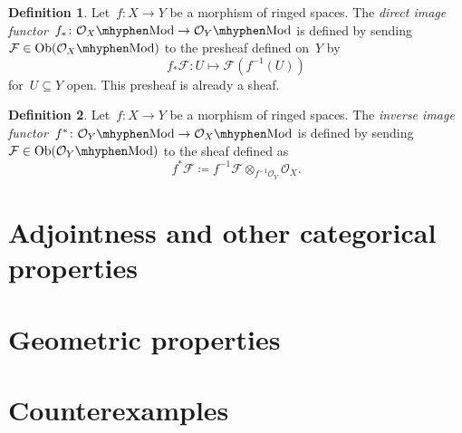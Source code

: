 \documentclass[a4paper,10pt]{article}
\theoremstyle{definition}
\newtheorem{definition}{Definition}
\DeclareMathOperator\Ob{Ob}
\begin{document}
\begin{definition}
  Let~$f\colon X\to Y$ be a morphism of ringed spaces. The \emph{direct image functor}~$f_*\colon\Mod{\mathcal{O}_X}\to\Mod{\mathcal{O}_Y}$ is defined by sending~$\mathcal{F}\in\Ob(\Mod{\mathcal{O}_X})$ to the presheaf defined on~$Y$ by
  \begin{equation}
    f_*\mathcal{F}\colon U\mapsto\mathcal{F}(f^{-1}(U))
    \label{equation:direct-image-O_X-modules}
  \end{equation}
  for~$U\subseteq Y$ open. This presheaf is already a sheaf.
\end{definition}

\begin{definition}
  Let~$f\colon X\to Y$ be a morphism of ringed spaces. The \emph{inverse image functor}~$f^*\colon\Mod{\mathcal{O}_Y}\to\Mod{\mathcal{O}_X}$ is defined by sending~$\mathcal{F}\in\Ob(\Mod{\mathcal{O}_Y})$ to the sheaf defined as
  \begin{equation}
    f^*\mathcal{F}\coloneqq f^{-1}\mathcal{F}\otimes_{f^{-1}\mathcal{O}_Y}\mathcal{O}_X.
    \label{equation:inverse-image-O_X-modules}
  \end{equation}
\end{definition}

\section{Adjointness and other categorical properties}
\label{section:categorical-properties}

\section{Geometric properties}
\label{section:geometric-properties}

\section{Counterexamples}
\label{section:counterexamples}

\nocite{*}
\printbibliography
\end{document}
